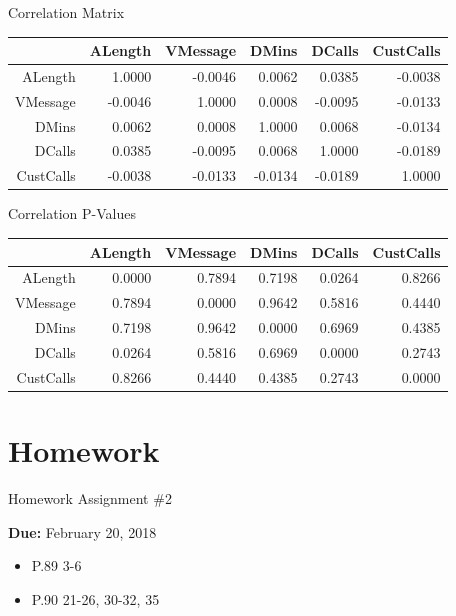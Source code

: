 \documentclass[handout]{beamer}
\begin{document}
\begin{frame}{Correlation Matrix}
\small
\begin{tabular}{r|rrrrr}
& ALength & VMessage & DMins & DCalls & CustCalls\\
\hline
ALength & 1.0000 & -0.0046  & 0.0062  & 0.0385 & -0.0038 \\
VMessage &  -0.0046 & 1.0000 &  0.0008 & -0.0095 & -0.0133\\
DMins & 0.0062 & 0.0008 & 1.0000 & 0.0068 & -0.0134\\
DCalls &  0.0385 & -0.0095 & 0.0068 & 1.0000 & -0.0189\\
CustCalls & -0.0038 & -0.0133 & -0.0134 & -0.0189 & 1.0000\\
\end{tabular}
\end{frame}

\begin{frame}{Correlation P-Values}
\small
\begin{tabular}{r|rrrrr}
& ALength & VMessage & DMins & DCalls & CustCalls\\
\hline
ALength & 0.0000 & 0.7894 & 0.7198 & 0.0264 & 0.8266\\
VMessage &  0.7894 & 0.0000 & 0.9642 & 0.5816 & 0.4440\\
DMins & 0.7198 & 0.9642 & 0.0000 & 0.6969 & 0.4385\\
DCalls &  0.0264 & 0.5816 & 0.6969 & 0.0000 & 0.2743\\
CustCalls & 0.8266 & 0.4440 & 0.4385 & 0.2743 & 0.0000\\
\end{tabular}
\end{frame}


\section{Homework}
\begin{frame}{Homework Assignment \#2}

  {\bf Due:} February 20, 2018
  \begin{itemize}
    \item P.89 3-6
    \item P.90 21-26, 30-32, 35
  \end{itemize}
\end{frame}
\end{document}

